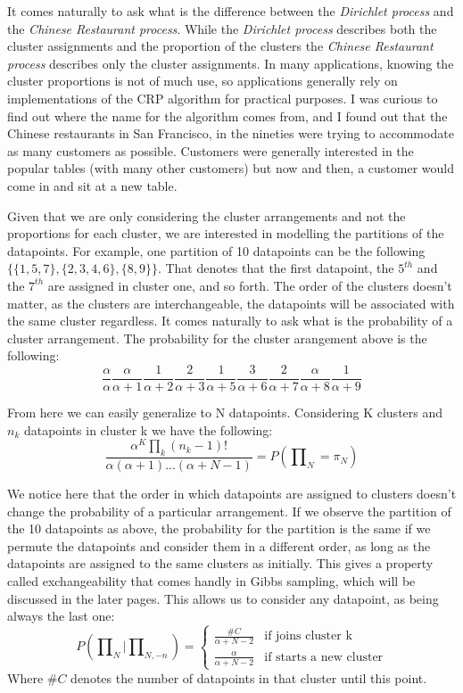 \documentclass[12pt,a4paper]{article}
\begin{document}
It comes naturally to ask what is the difference between the \textit{Dirichlet process} and the \textit{Chinese Restaurant process}. While the \textit{Dirichlet process} describes both the cluster assignments and the proportion of the clusters the \textit{Chinese Restaurant process} describes only the cluster assignments. In many applications, knowing the cluster proportions is not of much use, so applications generally rely on implementations of the CRP algorithm for practical purposes. I was curious to find out where the name for the algorithm comes from, and I found out that the Chinese restaurants in San Francisco, in the nineties were trying to accommodate as many customers as possible. Customers were generally interested in the popular tables (with many other customers) but now and then, a customer would come in and sit at a new table. 

Given that we are only considering the cluster arrangements and not the proportions for each cluster, we are interested in modelling the partitions of the datapoints. For example, one partition of 10 datapoints can be the following $\{\{1, 5, 7\}, \{2,3,4,6\}, \{8, 9\}\}$. That denotes that the first datapoint, the $5^{th}$ and the $7^{th}$ are assigned in cluster one, and so forth. The order of the clusters doesn't matter, as the clusters are interchangeable, the datapoints will be associated with the same cluster regardless. It comes naturally to ask what is the probability of a cluster arrangement. The probability for the cluster arangement above is the following: $$\frac{\alpha}{\alpha}\frac{\alpha}{\alpha+1}\frac{1}{\alpha+2}\frac{2}{\alpha+3}\frac{1}{\alpha+5}\frac{3}{\alpha+6}\frac{2}{\alpha+7}\frac{\alpha}{\alpha+8}\frac{1}{\alpha+9}$$

From here we can easily generalize to N datapoints. Considering K clusters and $n_{k}$ datapoints in cluster k we have the following: $$\frac{\alpha^{K} \prod_{k}(n_{k}-1)!}{\alpha(\alpha+1)...(\alpha+N-1)} = P(\prod\nolimits_{N} = \pi_{N})$$

We notice here that the order in which datapoints are assigned to clusters doesn't change the probability of a particular arrangement. If we observe the partition of the 10 datapoints as above, the probability for the partition is the same if we permute the datapoints and consider them in a different order, as long as the datapoints are assigned to the same clusters as initially. This gives a property called exchangeability that comes handly in Gibbs sampling, which will be discussed in the later pages. This allows us to consider any datapoint, as being always the last one: 
$$P(\prod\nolimits_{N}|\prod\nolimits_{N, -n})= \left \{
    \begin{array}{ll}
		\frac{\#C}{\alpha+ N - 2} & \mbox{if joins cluster k} \\
		\frac{\alpha}{\alpha+N-2} & \mbox{if starts a new cluster} 
	\end{array}
\right. $$ Where $\#C$ denotes the number of datapoints in that cluster until this point.
\end{document}
